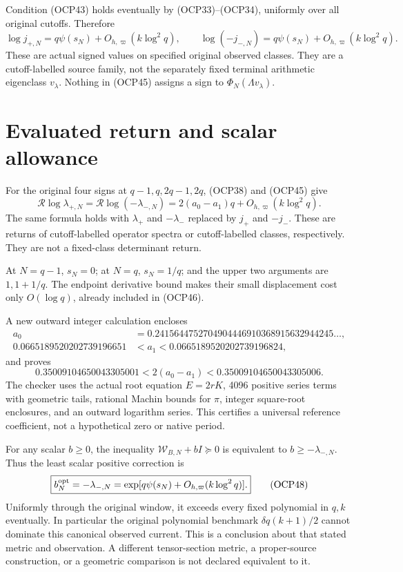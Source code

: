 \documentclass[11pt]{article}
\newcommand{\Rr}{\mathcal R}
\begin{document}
Condition (OCP43) holds eventually by (OCP33)--(OCP34), uniformly over all original cutoffs. Therefore
\[
 \boxed{\log j_{+,N}=q\psi(s_N)+O_{h,\varpi}(k\log^2q),\qquad
 \log(-j_{-,N})=q\psi(s_N)+O_{h,\varpi}(k\log^2q).}
 \tag{OCP45}
\]
These are actual signed values on specified original observed classes. They are a cutoff-labelled source family, not the separately fixed terminal arithmetic eigenclass $v_\lambda$. Nothing in (OCP45) assigns a sign to $\Phi_N(\Lambda v_\lambda)$.

\section{Evaluated return and scalar allowance}
For the original four signs at $q-1,q,2q-1,2q$, (OCP38) and (OCP45) give
\[
 \boxed{\Rr\log\lambda_{+,N}
 =\Rr\log(-\lambda_{-,N})
 =2(a_0-a_1)q+O_{h,\varpi}(k\log^2q).}
 \tag{OCP46}
\]
The same formula holds with $\lambda_+$ and $-\lambda_-$ replaced by $j_+$ and $-j_-$. These are returns of cutoff-labelled operator spectra or cutoff-labelled classes, respectively. They are not a fixed-class determinant return.

At $N=q-1$, $s_N=0$; at $N=q$, $s_N=1/q$; and the upper two arguments are $1,1+1/q$. The endpoint derivative bound makes their small displacement cost only $O(\log q)$, already included in (OCP46).

A new outward integer calculation encloses
\[
\begin{split}
a_0&=0.2415644752704904446910368915632944245\ldots,\\
0.0665189520202739196651&<a_1<0.0665189520202739196824,
\end{split}
\]
and proves
\[
 \boxed{0.35009104650043305001
 <2(a_0-a_1)<0.35009104650043305006.}
 \tag{OCP47}
\]
The checker uses the actual root equation $E=2rK$, 4096 positive series terms with geometric tails, rational Machin bounds for $\pi$, integer square-root enclosures, and an outward logarithm series. This certifies a universal reference coefficient, not a hypothetical zero or native period.

For any scalar $b\ge0$, the inequality $\mathscr W_{B,N}+bI\succeq0$ is equivalent to $b\ge-\lambda_{-,N}$. Thus the least scalar positive correction is
\[
 \boxed{b_N^{\rm opt}=-\lambda_{-,N}
 =\exp[q\psi(s_N)+O_{h,\varpi}(k\log^2q)].}
 \tag{OCP48}
\]
Uniformly through the original window, it exceeds every fixed polynomial in $q,k$ eventually. In particular the original polynomial benchmark $\delta q(k+1)/2$ cannot dominate this canonical observed current. This is a conclusion about that stated metric and observation. A different tensor-section metric, a proper-source construction, or a geometric comparison is not declared equivalent to it.
\end{document}
